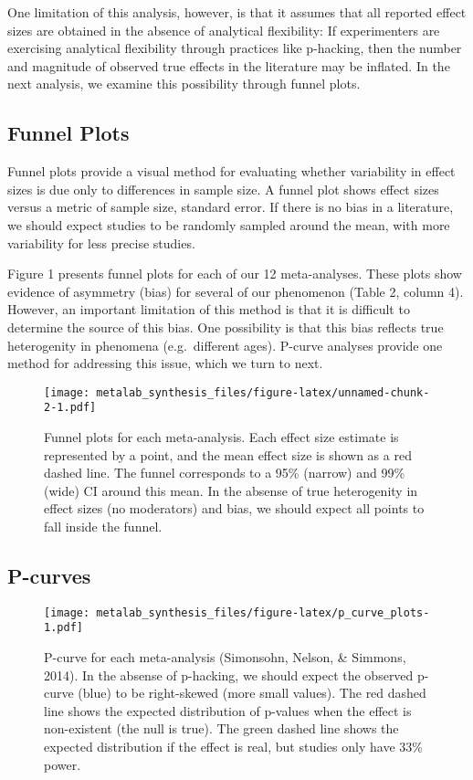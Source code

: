 \documentclass[english,floatsintext,man]{apa6}
\begin{document}
One limitation of this analysis, however, is that it assumes that all
reported effect sizes are obtained in the absence of analytical
flexibility: If experimenters are exercising analytical flexibility
through practices like p-hacking, then the number and magnitude of
observed true effects in the literature may be inflated. In the next
analysis, we examine this possibility through funnel plots.

\subsection{Funnel Plots}\label{funnel-plots}

Funnel plots provide a visual method for evaluating whether variability
in effect sizes is due only to differences in sample size. A funnel plot
shows effect sizes versus a metric of sample size, standard error. If
there is no bias in a literature, we should expect studies to be
randomly sampled around the mean, with more variability for less precise
studies.

Figure 1 presents funnel plots for each of our 12 meta-analyses. These
plots show evidence of asymmetry (bias) for several of our phenomenon
(Table 2, column 4). However, an important limitation of this method is
that it is difficult to determine the source of this bias. One
possibility is that this bias reflects true heterogenity in phenomena
(e.g.~different ages). P-curve analyses provide one method for
addressing this issue, which we turn to next.

\begin{figure}[htbp]
\centering
\texttt{[image: metalab\_synthesis\_files/figure-latex/unnamed-chunk-2-1.pdf]}
\caption{Funnel plots for each meta-analysis. Each effect size estimate
is represented by a point, and the mean effect size is shown as a red
dashed line. The funnel corresponds to a 95\% (narrow) and 99\% (wide)
CI around this mean. In the absense of true heterogenity in effect sizes
(no moderators) and bias, we should expect all points to fall inside the
funnel.}
\end{figure}

\subsection{P-curves}\label{p-curves}

\begin{figure}[htbp]
\centering
\texttt{[image: metalab\_synthesis\_files/figure-latex/p\_curve\_plots-1.pdf]}
\caption{P-curve for each meta-analysis (Simonsohn, Nelson, \& Simmons,
2014). In the absense of p-hacking, we should expect the observed
p-curve (blue) to be right-skewed (more small values). The red dashed
line shows the expected distribution of p-values when the effect is
non-existent (the null is true). The green dashed line shows the
expected distribution if the effect is real, but studies only have 33\%
power.}
\end{figure}
\end{document}
